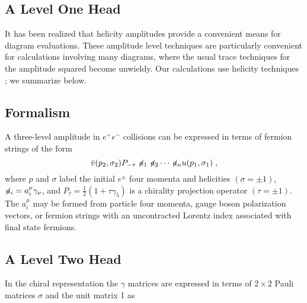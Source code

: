 \begin{article}
\section{A Level One Head}\label{text}
   It has been realized that helicity amplitudes provide
a convenient means for diagram evaluations.  These
amplitude level techniques are particularly convenient
for calculations involving many diagrams, where the
usual trace techniques for the amplitude squared become
unwieldy.  Our calculations use helicity techniques
\cite{stair76}; 
we summarize below.

\subsection{Formalism}
A three-level amplitude in $ e^+e^-$ collisions can be
expressed in terms of fermion strings of the form
\begin{equation}
   \bar v(p_2,\sigma_2)P_{-\tau}\not\!a_1\not\!a_2
   \cdots\not\!a_nu(p_1,\sigma_1)\;,
\end{equation}
where $p$ and $\sigma$ label the initial $e^{\pm}$
four momenta and helicities $(\sigma = \pm 1)$,
$\not\!a_i=a^\mu_i\gamma_\nu$, and 
$P_\tau=\frac{1}{2}(1+\tau\gamma_5)$ is a chirality 
projection operator $(\tau = \pm1)$.  The $a^\mu_i$ 
may be formed from particle four momenta, gauge boson
polarization vectors, or fermion strings with an 
uncontracted Lorentz index associated with final state 
fermions.

\subsection{A Level Two Head}
In the chiral representation the $\gamma$ matrices 
are expressed in terms of $2\times 2$ Pauli matrices 
$\sigma$ and the unit matrix 1 as

%
%



\end{article}
